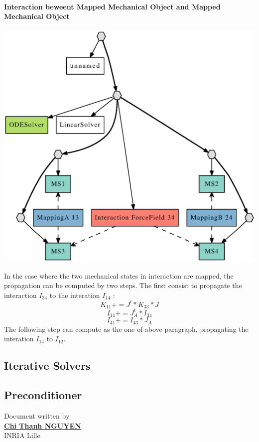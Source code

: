 \documentclass[a4paper,10pt]{article}
\begin{document}
\paragraph{Interaction beweent Mapped Mechanical Object and Mapped Mechanical Object}
\begin{center}
  \includegraphics[scale=0.3]{interaction_Mapped_Mapped}
\end{center}
In the case where the two mechanical states in interaction are mapped, the propagation can be computed by two steps. The first consist to propagate the interaction $I_{34}$ to the interation $I_{14}$ :
\[
K_{11} += J^t * K_{33} * J 
\]
\[
I_{14} += J^t_A * I_{34}
\]
\[
I_{41} += I_{43} * J_A 
\]
The following step can compute as the one of above paragraph, propagating the interation $I_{14}$ to $I_{12}$.
\subsection{Iterative Solvers }
\subsection{Preconditioner }



						      \begin{flushright}
						      Document written by \\
						      \href{mailto:chi-thanh.nguyen@inria.fr}{{\textbf {Chi Thanh NGUYEN}}} \\
						      INRIA Lille
						      \end{flushright}

%
%
\end{document}
